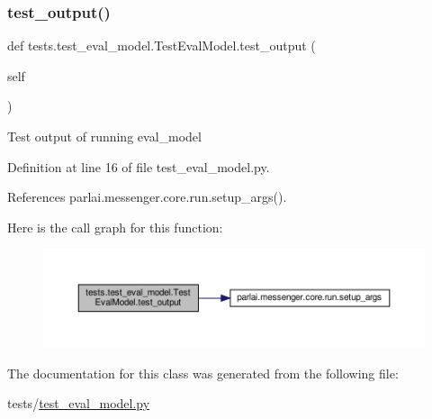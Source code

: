 \subsubsection{\texorpdfstring{test\+\_\+output()}{test\_output()}}
{\footnotesize\ttfamily def tests.\+test\+\_\+eval\+\_\+model.\+Test\+Eval\+Model.\+test\+\_\+output (\begin{DoxyParamCaption}\item[{}]{self }\end{DoxyParamCaption})}

\begin{DoxyVerb}Test output of running eval_model\end{DoxyVerb}
 

Definition at line 16 of file test\+\_\+eval\+\_\+model.\+py.



References parlai.\+messenger.\+core.\+run.\+setup\+\_\+args().

Here is the call graph for this function\+:
\nopagebreak
\begin{figure}[H]
\begin{center}
\leavevmode
\includegraphics[width=350pt]{classtests_1_1test__eval__model_1_1TestEvalModel_a899d6a41fb8f56be62a7145d9937ee52_cgraph}
\end{center}
\end{figure}


The documentation for this class was generated from the following file\+:\begin{DoxyCompactItemize}
\item 
tests/\hyperlink{test__eval__model_8py}{test\+\_\+eval\+\_\+model.\+py}\end{DoxyCompactItemize}
